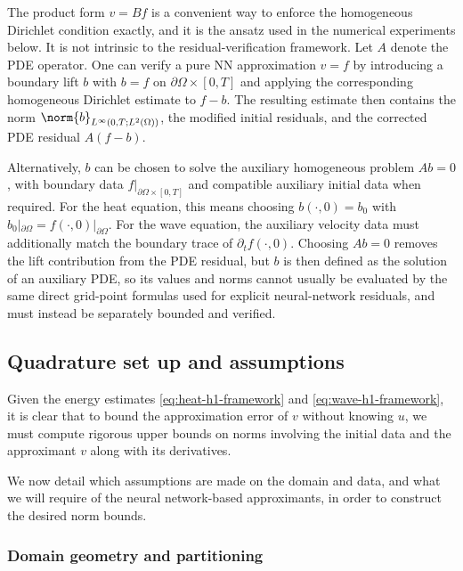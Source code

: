 \begin{remark}
The product form $v=Bf$ is a convenient way to enforce the homogeneous Dirichlet
condition exactly, and it is the ansatz used in the numerical experiments below.
It is not intrinsic to the residual-verification framework.  Let $A$ denote the PDE operator.  One can verify
a pure NN approximation $v=f$ by introducing a boundary lift $b$ with $b=f$ on
$\partial\Omega\times[0,T]$ and applying the corresponding homogeneous
Dirichlet estimate to $f-b$.  The resulting estimate then contains the norm
$\norm{b}_{L^\infty(0,T;L^2(\Omega))}$, the modified initial residuals, and the
corrected PDE residual $A(f-b)$.

Alternatively, $b$ can be chosen to solve the
auxiliary homogeneous problem $Ab=0$, with boundary data
$f|_{\partial\Omega\times[0,T]}$ and compatible auxiliary initial data when
required.  For the heat equation, this means choosing $b(\cdot,0)=b_0$ with
$b_0|_{\partial\Omega}=f(\cdot,0)|_{\partial\Omega}$.  For the
wave equation, the auxiliary velocity data must additionally
match the boundary trace of $\partial_t f(\cdot,0)$.  Choosing
$Ab=0$ removes the lift contribution from the PDE residual, but $b$ is then
defined as the solution of an auxiliary PDE, so its values and norms cannot
usually be evaluated by the same direct grid-point formulas used for explicit
neural-network residuals, and must instead be separately bounded and verified.
\end{remark}

\subsection{Quadrature set up and assumptions}\label{subsec:quadrature}
Given the energy estimates \eqref{eq:heat-h1-framework} and \eqref{eq:wave-h1-framework}, it is clear that to bound the approximation error of $v$ without knowing $u$, we must compute rigorous upper bounds on norms involving the initial data and the approximant $v$ along with its derivatives.

We now detail which assumptions are made on the domain and data, and what we will require of the neural network-based approximants, in order to construct the desired norm bounds.

\subsubsection{Domain geometry and partitioning}

